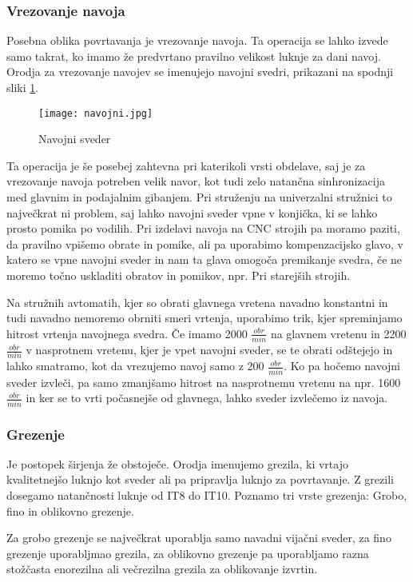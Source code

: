 \subsubsection{Vrezovanje navoja}
Posebna oblika povrtavanja je vrezovanje navoja. Ta operacija se
lahko izvede samo takrat, ko imamo že predvrtano pravilno
velikost luknje za dani navoj. Orodja za vrezovanje navojev se
imenujejo navojni svedri, prikazani na spodnji sliki \ref{navojni_sveder}.
\begin{figure}[H]
	\begin{center}
		\texttt{[image: navojni.jpg]}
		\caption{Navojni sveder
			\cite{sts_arhiv}}
		\label{navojni_sveder}
	\end{center}
\end{figure}
Ta operacija je še posebej zahtevna pri katerikoli vrsti obdelave,
saj je za vrezovanje navoja potreben velik navor, kot tudi zelo natančna
sinhronizacija med glavnim in podajalnim gibanjem. Pri struženju
na univerzalni stružnici to največkrat ni problem, saj lahko navojni
sveder vpne v konjička, ki se lahko prosto pomika po vodilih.
Pri izdelavi navoja na CNC strojih pa moramo paziti, da pravilno vpišemo
obrate in pomike, ali pa uporabimo kompenzacijsko glavo, v katero se
vpne navojni sveder in nam ta glava omogoča premikanje svedra, če
ne moremo točno uskladiti obratov in pomikov, npr. Pri starejših
strojih.

Na stružnih avtomatih, kjer so obrati glavnega vretena navadno konstantni
in tudi navadno nemoremo obrniti smeri vrtenja, uporabimo trik, kjer
spreminjamo hitrost vrtenja navojnega svedra. Če imamo 2000 \(\frac{obr}{min}\)
na glavnem vretenu in 2200 \(\frac{obr}{min}\) v nasprotnem vretenu, kjer je
vpet navojni sveder, se te obrati odštejejo in lahko smatramo, kot da vrezujemo
navoj samo z 200 \(\frac{obr}{min}\). Ko pa hočemo navojni sveder izvleči, pa samo
zmanjšamo hitrost na nasprotnemu vretenu na npr. 1600 \(\frac{obr}{min}\)
in ker se to vrti počasnejše od glavnega, lahko sveder izvlečemo iz navoja.

\subsubsection{Grezenje}
Je postopek širjenja že obstoječe. Orodja imenujemo grezila,
ki vrtajo kvalitetnejšo luknjo kot sveder ali pa pripravlja
luknjo za povrtavanje. Z grezili dosegamo natančnosti luknje od
IT8 do IT10. Poznamo tri vrste grezenja: Grobo, fino in oblikovno grezenje.

Za grobo grezenje se največkrat uporablja samo navadni vijačni
sveder, za fino grezenje uporabljmao grezila, za oblikovno grezenje
pa uporabljamo razna stožčasta enorezilna ali večrezilna grezila
za oblikovanje izvrtin.

